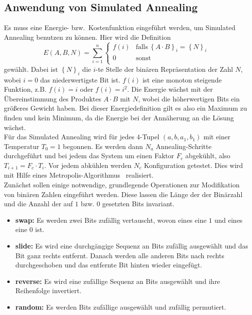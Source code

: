 \subsection{Anwendung von Simulated Annealing}
Es muss eine Energie- bzw.\ Kostenfunktion eingeführt werden, um Simulated Annealing benutzen zu können. Hier wird die Definition
\begin{equation*}
		E\left(A,B,N\right)=\sum\limits_{i=1}^n\begin{cases}
		  		f\left(i\right) & \mathrm{falls}\:{\left\{A\cdot B\right\}}_i={\left\{N\right\}}_i \\
						0 & \mathrm{sonst}\\
				\end{cases}
\end{equation*}
gewählt. Dabei ist ${\left\{N\right\}}_i$ die $i$-te Stelle der binären Repräsentation der Zahl $N$, wobei $i=0$ das niederwertigste Bit ist. $f\left(i\right)$ ist eine monoton steigende Funktion, z.B. $f\left(i\right)=i$ oder $f\left(i\right)=i^2$. Die Energie wächst mit der Übereinstimmung des Produktes $A\cdot B$ mit $N$, wobei die höherwertigen Bits ein größeres Gewicht haben. Bei dieser Energiedefinition gilt es also ein Maximum zu finden und kein Minimum, da die Energie bei der Annäherung an die Lösung wächst. \\
Für das Simulated Annealing wird für jedes $4$-Tupel $\left(a,b,a_1,b_1\right)$ mit einer Temperatur $T_0=1$ begonnen. Es werden dann $N_a$ Annealing-Schritte durchgeführt und bei jedem das System um einen Faktor $F_c$ abgekühlt, also $T_{i+1}=F_c\cdot T_i$. Vor jedem abkühlen werden $N_c$ Konfiguration getestet. Dies wird mit Hilfe eines Metropolis-Algorithmus~\parencite{metropolis} realisiert. \\
Zunächst sollen einige notwendige, grundlegende Operationen zur Modifikation von binären Zahlen eingeführt werden. Diese lassen die Länge der der Binärzahl und die Anzahl der auf $1$ bzw. $0$ gesetzten Bits invariant.
\begin{itemize}
		\item \textbf{swap:} Es werden zwei Bits zufällig vertauscht, wovon eines eine $1$ und eines eine $0$ ist.
		\item \textbf{slide:} Es wird eine durchgängige Sequenz an Bits zufällig ausgewählt und das Bit ganz rechts entfernt. Danach werden alle anderen Bits nach rechts durchgeschoben und das entfernte Bit hinten wieder eingefügt.
		\item \textbf{reverse:} Es wird eine zufällige Sequenz an Bits ausgewählt und ihre Reihenfolge invertiert.
		\item \textbf{random:} Es werden Bits zufällige ausgewählt und zufällig permutiert.
\end{itemize}
